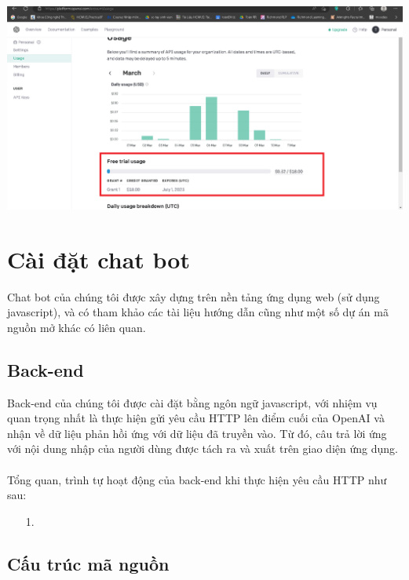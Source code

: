 \documentclass[a4paper, 12pt]{article}
\begin{document}
\begin{itemize}
\begin{centering}
		\includegraphics[width = 170mm]{4.5.png}
	\end{centering}
	\end{itemize}
	
	\section{Cài đặt chat bot}
	Chat bot của chúng tôi được xây dựng trên nền tảng ứng dụng web (sử dụng javascript), và có tham khảo các tài liệu hướng dẫn cũng như một số dự án mã nguồn mở khác có liên quan.
	\subsection{Back-end}
	Back-end của chúng tôi được cài đặt bằng ngôn ngữ javascript, với nhiệm vụ quan trọng nhất là thực hiện gửi yêu cầu HTTP lên điểm cuối của OpenAI và nhận về dữ liệu phản hồi ứng với dữ liệu đã truyền vào. Từ đó, câu trả lời ứng với nội dung nhập của người dùng được tách ra và xuất trên giao diện ứng dụng.
	\\
	\\
	Tổng quan, trình tự hoạt động của back-end khi thực hiện yêu cầu HTTP như sau:
	\begin{itemize}
		\item[1.] 
	\end{itemize}
	
	
	\subsection{Cấu trúc mã nguồn}
	
\end{document}
